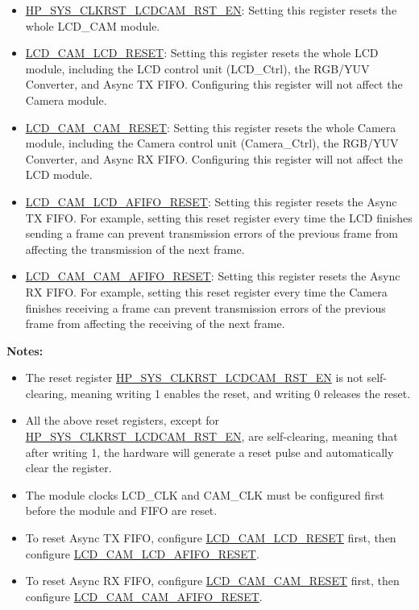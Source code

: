 \documentclass[main\_\_EN.tex]{subfiles}
\begin{document}
\begin{itemize}
    \item \hyperref[fielddesc:HPSYSCLKRSTLCDCAMRSTEN]{HP\_SYS\_CLKRST\_LCDCAM\_RST\_EN}: Setting this register resets the whole LCD\_CAM module.
    \item \hyperref[fielddesc:LCDCAMLCDRESET]{LCD\_CAM\_LCD\_RESET}: Setting this register resets the whole LCD module, including the LCD control unit (LCD\_Ctrl), the RGB/YUV Converter, and Async TX FIFO. Configuring this register will not affect the Camera module.
    \item \hyperref[fielddesc:LCDCAMCAMRESET]{LCD\_CAM\_CAM\_RESET}: Setting this register resets the whole Camera module, including the Camera control unit (Camera\_Ctrl), the RGB/YUV Converter, and Async RX FIFO. Configuring this register will not affect the LCD module.
    \item \hyperref[fielddesc:LCDCAMLCDAFIFORESET]{LCD\_CAM\_LCD\_AFIFO\_RESET}: Setting this register resets the Async TX FIFO. For example, setting this reset register every time the LCD finishes sending a frame can prevent transmission errors of the previous frame from affecting the transmission of the next frame.
    \item \hyperref[fielddesc:LCDCAMCAMAFIFORESET]{LCD\_CAM\_CAM\_AFIFO\_RESET}: Setting this register resets the Async RX FIFO. For example, setting this reset register every time the Camera finishes receiving a frame can prevent transmission errors of the previous frame from affecting the receiving of the next frame.
\end{itemize}

{\bfseries Notes: }
\begin{itemize}
    \item The reset register \hyperref[fielddesc:HPSYSCLKRSTLCDCAMRSTEN]{HP\_SYS\_CLKRST\_LCDCAM\_RST\_EN} is not self-clearing, meaning writing 1 enables the reset, and writing 0 releases the reset.
    \item All the above reset registers, except for \hyperref[fielddesc:HPSYSCLKRSTLCDCAMRSTEN]{HP\_SYS\_CLKRST\_LCDCAM\_RST\_EN}, are self-clearing, meaning that after writing 1, the hardware will generate a reset pulse and automatically clear the register.
    \item The module clocks LCD\_CLK and CAM\_CLK must be configured first before the module and FIFO are reset.
    \item To reset Async TX FIFO, configure \hyperref[fielddesc:LCDCAMLCDRESET]{LCD\_CAM\_LCD\_RESET} first, then configure \hyperref[fielddesc:LCDCAMLCDAFIFORESET]{LCD\_CAM\_LCD\_AFIFO\_RESET}.
    \item To reset Async RX FIFO, configure \hyperref[fielddesc:LCDCAMCAMRESET]{LCD\_CAM\_CAM\_RESET} first, then configure \hyperref[fielddesc:LCDCAMCAMAFIFORESET]{LCD\_CAM\_CAM\_AFIFO\_RESET}.
\end{itemize}
\end{document}
